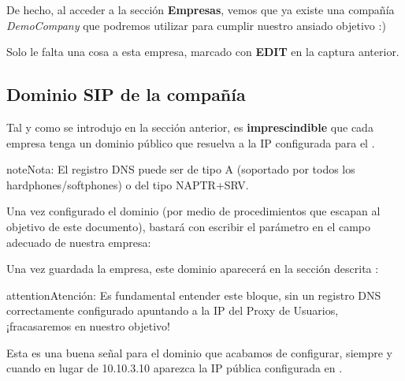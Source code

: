 \documentclass[letterpaper,10pt,spanish]{sphinxmanual}
\begin{document}
De hecho, al acceder a la sección \textbf{Empresas}, vemos que ya existe una compañía \emph{DemoCompany} que podremos utilizar para cumplir nuestro ansiado objetivo :)

\noindent{}

Solo le falta una cosa a esta empresa, marcado con \textbf{EDIT} en la captura anterior.


\subsection{Dominio SIP de la compañía}
\label{internal_calls/brand_portal:dominio-sip-de-la-compania}\label{internal_calls/brand_portal:domain-per-company}
Tal y como se introdujo en la sección anterior, es \textbf{imprescindible} que cada empresa tenga un dominio público que resuelva a la IP configurada para el {\hyperref[internal_calls/god_portal:proxyusers]{}}.

\begin{notice}{note}{Nota:}
El registro DNS puede ser de tipo A (soportado por todos los hardphones/softphones) o del tipo NAPTR+SRV.
\end{notice}

Una vez configurado el dominio (por medio de procedimientos que escapan al objetivo de este documento), bastará con escribir el parámetro en el campo adecuado de nuestra empresa:

\noindent{}

Una vez guardada la empresa, este dominio aparecerá en la sección descrita {\hyperref[internal_calls/god_portal:god\string-sipdomains]{}}:

\noindent{}

\begin{notice}{attention}{Atención:}
Es fundamental entender este bloque, sin un registro DNS correctamente configurado apuntando a la IP del Proxy de Usuarios, ¡fracasaremos en nuestro objetivo!
\end{notice}

Esta es una buena señal para el dominio que acabamos de configurar, siempre y cuando en lugar de 10.10.3.10 aparezca la IP pública configurada en {\hyperref[internal_calls/god_portal:proxyusers]{}}.

\noindent{}
\end{document}
